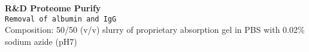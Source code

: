 \textbf{R&D Proteome Purify} 
\\
\texttt{Removal of albumin and IgG}
\\
Composition: 50/50 (v/v) slurry of proprietary absorption gel in PBS with 0.02\% sodium azide (pH7)
